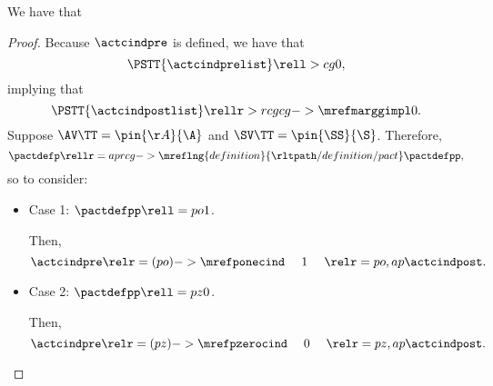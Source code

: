 \begin{proposition}
  \nrp
  We have that %
\end{proposition}

\begin{proof}
  \nrp
  Because $\actcindpre$ is defined,
  we have that 
  $$\PSTT{\actcindprelist} \rell > cg 0,$$ 
  implying that
  \nrp
  $$\PSTT{\actcindpostlist} \rellr > rcg {cg->\mrefmarggimpl} 0.$$
  Suppose 
  \nrp
  $\AV\TT = \pin{\AA}{\A}$
  and
  $\SV\TT = \pin{\SS}{\S}$. Therefore,
  $$\pactdefp \rellr = ap {rcg->\mreflng{definition}{\rltpath/definition/pact}} \pactdefpp,$$
  \nrp
  so  to consider:
  \begin{itemize}
    \item \nrp Case 1: $\pactdefpp \rell = po 1$.

      \nrp
      Then,
      $$\actcindpre \relr = (po)->{\mrefponecind} \ \ \ \ 1\ \ \ \ \relr = po,ap \actcindpost.$$
    \item \nrp Case 2: $\pactdefpp \rell = pz 0$.

      \nrp
      Then,
      $$\actcindpre \relr = (pz)->{\mrefpzerocind} \ \ \ \ 0\ \ \ \ \relr = pz,ap \actcindpost.$$
  \end{itemize}
\end{proof}
